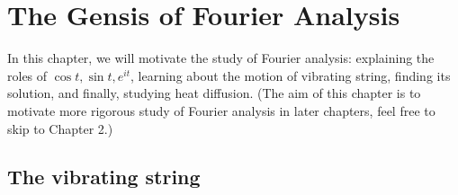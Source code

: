 \chapter{The Gensis of Fourier Analysis}

In this chapter, we will motivate the study of Fourier analysis: explaining the roles of $\cos t, \sin t, e^{it}$, learning about the motion of vibrating string, finding its solution, and finally, studying heat diffusion. (The aim of this chapter is to motivate more rigorous study of Fourier analysis in later chapters, feel free to skip to Chapter 2.)

\section{The vibrating string}





